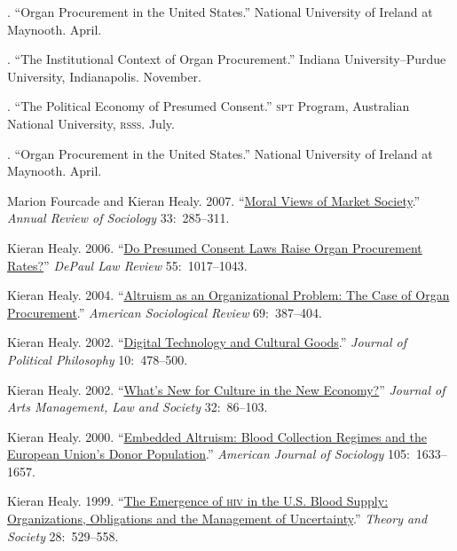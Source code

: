 \documentclass[11pt]{article}
\begin{document}
. ``Organ Procurement in the United States.'' National University of
Ireland at Maynooth. April. 

. ``The Institutional Context of Organ Procurement.'' Indiana
University--Purdue University, Indianapolis. November.

. ``The Political Economy of Presumed Consent.'' \textsc{spt} Program,
Australian National University, \textsc{rsss}. July. 

. ``Organ Procurement in the United States.'' National University of
Ireland at Maynooth. April. 

\bigskip

\medskip
\ind Marion Fourcade and Kieran Healy. 2007. ``\href{http://arjournals.annualreviews.org/doi/pdf/10.1146/annurev.soc.33.040406.131642}{Moral Views of Market Society}.'' \emph{Annual Review of Sociology} 33:~285--311. 

\ind Kieran Healy. 2006. ``\href{http://www.kieranhealy.org/files/papers/presumed-consent.pdf}{Do Presumed Consent Laws Raise Organ Procurement Rates?}'' \emph{DePaul Law Review} 55:~1017--1043. 

\ind Kieran Healy. 2004. ``\href{http://www.kieranhealy.org/files/papers/asr2004.pdf}{Altruism as an Organizational Problem: The Case of Organ Procurement}.''
 \emph{American Sociological Review} 69:~387--404.

\ind Kieran Healy. 2002. ``\href{http://www.kieranhealy.org/files/papers/jpp.pdf}{Digital Technology and Cultural Goods}.'' \emph{Journal of
  Political Philosophy} 10:~478--500. 

\ind Kieran Healy. 2002. ``\href{http://www.kieranhealy.org/files/papers/culture-newecon.pdf}{What's New for Culture in the New Economy?}'' \emph{Journal
  of Arts Management, Law and Society} 32:~86--103. 


\ind Kieran Healy. 2000. ``\href{http://www.kieranhealy.org/files/papers/embed-alt.pdf}{Embedded Altruism: Blood Collection Regimes and the European
  Union's Donor Population}.'' \emph{American Journal of Sociology} 105:~1633--\,1657.


\ind Kieran Healy. 1999.  ``\href{http://www.kieranhealy.org/files/papers/ts.pdf}{The Emergence of \textsc{hiv} in the U.S. Blood Supply: Organizations,
  Obligations and the Management of Uncertainty}.'' \emph{Theory and Society} 28:~529--558.
\end{document}
